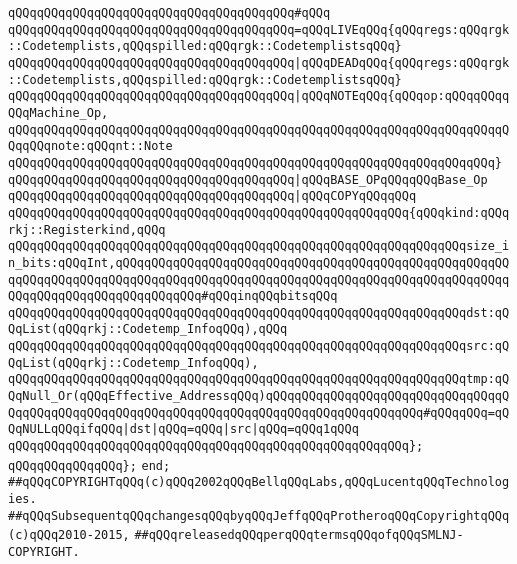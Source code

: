 \verb|qQQqqQQqqQQqqQQqqQQqqQQqqQQqqQQqqQQqqQQq#qQQq|\newline
\verb|qQQqqQQqqQQqqQQqqQQqqQQqqQQqqQQqqQQqqQQq=qQQqLIVEqQQq{qQQqregs:qQQqrgk::Codetemplists,qQQqspilled:qQQqrgk::CodetemplistsqQQq}|\newline
\verb|qQQqqQQqqQQqqQQqqQQqqQQqqQQqqQQqqQQqqQQq|\verb#|qQQqDEADqQQq{qQQqregs:qQQqrgk::Codetemplists,qQQqspilled:qQQqrgk::CodetemplistsqQQq}#\newline
\verb|qQQqqQQqqQQqqQQqqQQqqQQqqQQqqQQqqQQqqQQq|\verb#|qQQqNOTEqQQq{qQQqop:qQQqqQQqqQQqMachine_Op,#\newline
\verb|qQQqqQQqqQQqqQQqqQQqqQQqqQQqqQQqqQQqqQQqqQQqqQQqqQQqqQQqqQQqqQQqqQQqqQQqqQQqnote:qQQqnt::Note|\newline
\verb|qQQqqQQqqQQqqQQqqQQqqQQqqQQqqQQqqQQqqQQqqQQqqQQqqQQqqQQqqQQqqQQqqQQq}|\newline
\verb|qQQqqQQqqQQqqQQqqQQqqQQqqQQqqQQqqQQqqQQq|\verb#|qQQqBASE_OPqQQqqQQqBase_Op#\newline
\verb|qQQqqQQqqQQqqQQqqQQqqQQqqQQqqQQqqQQqqQQq|\verb#|qQQqCOPYqQQqqQQq#\newline
\verb|qQQqqQQqqQQqqQQqqQQqqQQqqQQqqQQqqQQqqQQqqQQqqQQqqQQqqQQq{qQQqkind:qQQqrkj::Registerkind,qQQq|\newline
\verb|qQQqqQQqqQQqqQQqqQQqqQQqqQQqqQQqqQQqqQQqqQQqqQQqqQQqqQQqqQQqqQQqsize_in_bits:qQQqInt,qQQqqQQqqQQqqQQqqQQqqQQqqQQqqQQqqQQqqQQqqQQqqQQqqQQqqQQqqQQqqQQqqQQqqQQqqQQqqQQqqQQqqQQqqQQqqQQqqQQqqQQqqQQqqQQqqQQqqQQqqQQqqQQqqQQqqQQqqQQqqQQqqQQqqQQq#qQQqinqQQqbitsqQQq|\newline
\verb|qQQqqQQqqQQqqQQqqQQqqQQqqQQqqQQqqQQqqQQqqQQqqQQqqQQqqQQqqQQqqQQqdst:qQQqList(qQQqrkj::Codetemp_InfoqQQq),qQQq|\newline
\verb|qQQqqQQqqQQqqQQqqQQqqQQqqQQqqQQqqQQqqQQqqQQqqQQqqQQqqQQqqQQqqQQqsrc:qQQqList(qQQqrkj::Codetemp_InfoqQQq),|\newline
\verb|qQQqqQQqqQQqqQQqqQQqqQQqqQQqqQQqqQQqqQQqqQQqqQQqqQQqqQQqqQQqqQQqtmp:qQQqNull_Or(qQQqEffective_AddressqQQq)qQQqqQQqqQQqqQQqqQQqqQQqqQQqqQQqqQQqqQQqqQQqqQQqqQQqqQQqqQQqqQQqqQQqqQQqqQQqqQQqqQQqqQQqqQQq#qQQqqQQq=qQQqNULLqQQqifqQQq|\verb#|dst|qQQq=qQQq|src|qQQq=qQQq1qQQq#\newline
\verb|qQQqqQQqqQQqqQQqqQQqqQQqqQQqqQQqqQQqqQQqqQQqqQQqqQQqqQQq};|\newline
\verb|qQQqqQQqqQQqqQQq};|\newline
\verb|end;|\newline
\newline
\verb|##qQQqCOPYRIGHTqQQq(c)qQQq2002qQQqBellqQQqLabs,qQQqLucentqQQqTechnologies.|\newline
\verb|##qQQqSubsequentqQQqchangesqQQqbyqQQqJeffqQQqProtheroqQQqCopyrightqQQq(c)qQQq2010-2015,|\newline
\verb|##qQQqreleasedqQQqperqQQqtermsqQQqofqQQqSMLNJ-COPYRIGHT.|\newline

